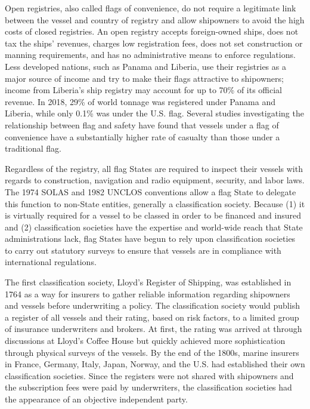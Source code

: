 \documentclass[twoside,symmetric,notoc]{tufte-book}
\begin{document}
\par{%
Open registries, also called flags of convenience, do not require a legitimate link between the vessel and country of registry and allow shipowners to avoid the high costs of closed registries. An open registry accepts foreign-owned ships, does not tax the ships' revenues, charges low registration fees, does not set construction or manning requirements, and has no administrative means to enforce regulations. Less developed nations, such as Panama and Liberia, use their registries as a major source of income and try to make their flags attractive to shipowners; income from Liberia's ship registry may account for up to 70\% of its official revenue.\cite{Wiswall}\cite{Sharife} In 2018, 29\% of world tonnage was registered under Panama and Liberia,\cite{UN_2018} while only 0.1\% was under the U.S. flag.\cite{DOT} Several studies investigating the relationship between flag and safety have found that vessels under a flag of convenience have a substantially higher rate of casualty than those under a traditional flag.\cite{Boisson}
}
\par{%
Regardless of the registry, all flag States are required to inspect their vessels with regards to construction, navigation and radio equipment, security, and labor laws.\cite{Lagoni} The 1974 SOLAS and 1982 UNCLOS conventions allow a flag State to delegate this function to non-State entities,\cite{solas} generally a classification society. Because (1) it is virtually required for a vessel to be classed in order to be financed and insured and (2) classification societies have the expertise and world-wide reach that State administrations lack, flag States have begun to rely upon classification societies to carry out statutory surveys to ensure that vessels are in compliance with international regulations.\cite{Hosanee}
}
\par{%
The first classification society, Lloyd's Register of Shipping, was established in 1764 as a way for insurers to gather reliable information regarding shipowners and vessels before underwriting a policy. The classification society would publish a register of all vessels and their rating, based on risk factors, to a limited group of insurance underwriters and brokers. At first, the rating was arrived at through discussions at Lloyd's Coffee House but quickly achieved more sophistication through physical surveys of the vessels.\cite{Boisson_1994} By the end of the 1800s, marine insurers in France, Germany, Italy, Japan, Norway, and the U.S. had established their own classification societies. Since the registers were not shared with shipowners and the subscription fees were paid by underwriters, the classification societies had the appearance of an objective independent party. 
}
\end{document}
